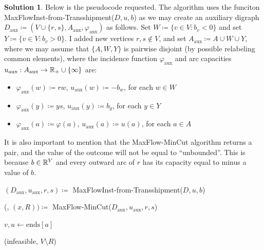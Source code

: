 \documentclass[11pt,leqno,final]{amsart}
\theoremstyle{definition}
\newtheorem{solution}{Solution}
\begin{document}
\begin{solution}
    Below is the pseudocode requested. The algorithm uses the funciton MaxFlowInst-from-Transshipment($D, u, b$) as we may create an auxiliary digraph $D_{\text{aux}} \coloneqq (V \cup \{r,s\}, A_{\text{aux}}, \varphi_{\text{aux}})$ as follows. Set $W \coloneqq \{v \in V : b_v < 0\}$ and set $Y \coloneqq \{v \in V : b_v > 0\}$. I added new vertices $r,s \notin V$, and set $A_{\text{aux}} \coloneqq A\cup W \cup Y$, where we may assume that $\{A, W, Y\}$ is pairwise disjoint (by possible relabeling common elements), where the incidence function $\varphi_{\text{aux}}$ and arc capacities $u_{\text{aux}}: A_{\text{aux}} \to \mathbb{R}_{+} \cup \{\infty\}$ are:
    \begin{itemize}
      \item $\varphi_{\text{aux}}(w) \coloneqq rw$, $u_{\text{aux}}(w) \coloneqq -b_w$, for each $w \in W$
      \item $\varphi_{\text{aux}}(y) \coloneqq ys$, $u_{\text{aux}}(y) \coloneqq b_y$, for each $y \in Y$
      \item $\varphi_{\text{aux}}(a) \coloneqq \varphi(a)$, $u_{\text{aux}}(a) \coloneqq u(a)$, for each $a \in A$
    \end{itemize}

    It is also important to mention that the MaxFlow-MinCut algorithm returns a pair, and the value of the outcome will not be equal to ``unbounded''. This is because $b \in \mathbb{R}^{V}$ and every outward arc of $r$ has its capacity equal to minus a value of $b$.

    \begin{algorithm}
        \caption{Transshipment($D$, $u$, $b$)}\label{trans}
        \begin{algorithmic}

          \State $(D_{\text{aux}}, u_{\text{aux}}, r, s) \coloneqq$ MaxFlowInst-from-Transshipment($D, u, b$)
          
          \State (\underline{\hspace{.15in}}, $(x, R)) \coloneqq$ MaxFlow-MinCut($D_{\text{aux}}, u_{\text{aux}}, r, s$)

            \State $v,u \gets \text{ends}[a]$

              
                \State \Return (infeasible, $V \setminus R$)  
              \EndIf
            

\end{algorithmic}
\end{algorithm}
\end{solution}
\end{document}

